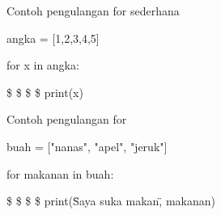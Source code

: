 \vspace{\baselineskip}
\vspace{12pt}
\noindent 
Contoh pengulangan for sederhana \par
\noindent 
\vspace{\baselineskip}
angka = [1,2,3,4,5] \par
\noindent 
\vspace{\baselineskip}
for x in angka: \par
\noindent 
\vspace{\baselineskip}
 \$  \$  \$  \$ print(x) \par
\noindent 
\vspace{\baselineskip}
\vspace{\baselineskip}
Contoh pengulangan for \par
\noindent 
\vspace{\baselineskip}
buah = ["nanas", "apel", "jeruk"] \par
\noindent 
\vspace{\baselineskip}
for makanan in buah: \par
\noindent 
\vspace{\baselineskip}
 \$  \$  \$  \$ print(\"Saya suka makan\", makanan) \par
\noindent 
\vspace{\baselineskip}
\vspace{\baselineskip}
\vspace{12pt}
\noindent 
